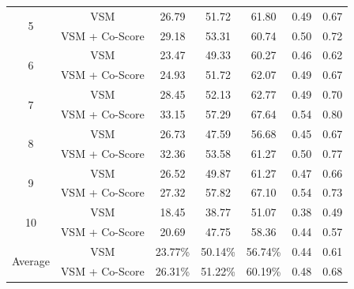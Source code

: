 \documentclass[conference]{IEEEtran}
\begin{document}
\begin{table}[htbp]
{\begin{tabular}{c|c|c|c|c|c|c}
			\multirow{2}{*}{5}                                                                               & VSM & 26.79 & 51.72 & 61.80 & 0.49 & 0.67 \\   \cline{2-7} &VSM + Co-Score                                                                       & 29.18                                                 & 53.31                                                 & 60.74                                                  &  0.50   & 0.72     \\  \hline
			\multirow{2}{*}{6}                                                                               & VSM & 23.47 & 49.33 & 60.27 & 0.46 & 0.62 \\  \cline{2-7}  &VSM + Co-Score 
			&24.93 &
			51.72 &
			62.07 & 0.49 &
			0.67     \\  \hline 
			\multirow{2}{*}{7}                                                                               & VSM & 28.45 & 52.13 & 62.77 & 0.49 & 0.70 \\  \cline{2-7}  &VSM + Co-Score 
			
			&33.15 &
			57.29 &
			67.64 & 0.54 &
			0.80     \\  \hline
			\multirow{2}{*}{8}                                                                               & VSM & 26.73 & 47.59 & 56.68 & 0.45 & 0.67 \\  \cline{2-7}  &VSM + Co-Score 
			&32.36 &
			53.58 &
			61.27 & 0.50 &
			0.77    \\  \hline
			\multirow{2}{*}{9}                                                                               & VSM & 26.52 & 49.87 & 61.27 & 0.47 & 0.66 \\  \cline{2-7}   &VSM + Co-Score 
			&27.32 &
			57.82 &
			67.10 & 0.54 &
			0.73    \\  \hline
			\multirow{2}{*}{10}                                                                               & VSM & 18.45 & 38.77 & 51.07 & 0.38 & 0.49 \\  \cline{2-7}  &VSM + Co-Score
			&20.69 &
			47.75 &
			58.36 & 0.44 &
			0.57    \\ \hline \hline
			\multirow{2}{*}{Average}                                                                               & VSM & 23.77\% & 50.14\% & 56.74\% & 0.44 & 0.61 \\  \cline{2-7}   &VSM + Co-Score      & 26.31\%                                                 & 51.22\%                                                 & 60.19\%                                                  &   0.48  &  0.68    \\ 
			\hline
	\end{tabular}}
\centering
\end{table}
\end{document}

